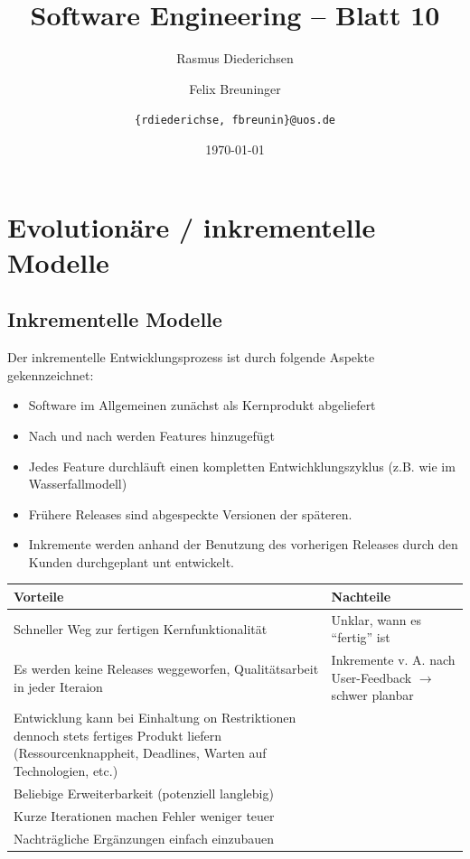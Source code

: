\documentclass{scrartcl}
\title{\rmfamily Software Engineering -- Blatt 10}
\author{Rasmus Diederichsen \and Felix Breuninger\and 
   \texttt{\{rdiederichse, fbreunin\}@uos.de}
}
\date{\today}
\begin{document}
\selectfont
\maketitle

\section{Evolutionäre / inkrementelle Modelle}

\subsection{Inkrementelle Modelle}

Der inkrementelle Entwicklungsprozess ist durch folgende Aspekte gekennzeichnet:
\begin{itemize}
   \item Software im Allgemeinen zunächst als Kernprodukt abgeliefert
   \item Nach und nach werden Features hinzugefügt
   \item Jedes Feature durchläuft einen kompletten Entwichklungszyklus (z.B. wie
      im Wasserfallmodell)
   \item Frühere Releases sind abgespeckte Versionen der späteren.
   \item Inkremente werden anhand der Benutzung des vorherigen Releases durch
      den Kunden durchgeplant unt entwickelt.
\end{itemize}

\begin{center}
   \begin{tabular}{VN}
      \toprule
      \textbf{Vorteile} & \textbf{Nachteile} \\ 
      \midrule
       Schneller Weg zur fertigen Kernfunktionalität & Unklar, wann es ``fertig'' ist \\
       Es werden keine Releases weggeworfen, Qualitätsarbeit in jeder Iteraion  & Inkremente v. A. nach User-Feedback $\rightarrow$ schwer planbar \\
       Entwicklung kann bei Einhaltung on Restriktionen dennoch stets fertiges
       Produkt liefern (Ressourcenknappheit, Deadlines, Warten auf Technologien,
       etc.) & \\
       Beliebige Erweiterbarkeit (potenziell langlebig) & \\
       Kurze Iterationen machen Fehler weniger teuer & \\
       Nachträgliche Ergänzungen einfach einzubauen & \\
   \end{tabular}
\end{center}
\end{document}
